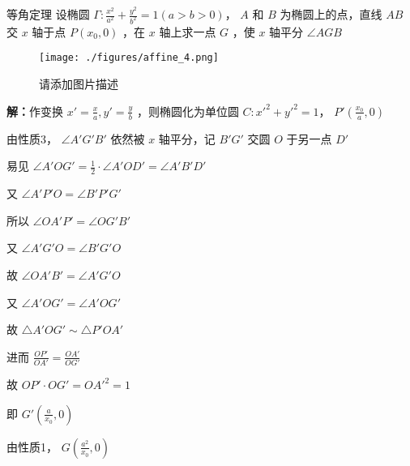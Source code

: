 \begin{corollary}{等角定理}
设椭圆 $\displaystyle{\Gamma:\frac{x^2}{a^2}+\frac{y^2}{b^2}=1(a>b>0)}$， $\displaystyle{A}$ 和 $\displaystyle{B}$ 为椭圆上的点，直线 $\displaystyle{AB}$ 交 $\displaystyle{x}$ 轴于点 $\displaystyle{P(x_0,0)}$ ，在 $\displaystyle{x}$ 轴上求一点 $\displaystyle{G}$ ，使 $\displaystyle{x}$ 轴平分 $\displaystyle{\angle AGB}$ 

\begin{figure}[ht]
\centering
\texttt{[image: ./figures/affine\_4.png]}
\caption{请添加图片描述} \label{affine_fig4}
\end{figure}
\textbf{解：}作变换 $\displaystyle{x'=\frac{x}{a},y'=\frac{y}{b}}$ ，则椭圆化为单位圆 $\displaystyle{C:x'^2+y'^2=1}$， $\displaystyle{P'\left(\frac{x_0}{a},0 \right)}$ 

由性质3， $\displaystyle{\angle A'G'B'}$ 依然被 $\displaystyle{x}$ 轴平分，记 $\displaystyle{B'G'}$ 交圆 $\displaystyle{O}$ 于另一点 $\displaystyle{D'}$

易见 $\displaystyle{\angle A'OG'=\frac{1}{2}\cdot\angle A'OD'=\angle A'B'D'}$ 

又 $\displaystyle{\angle A'P'O=\angle B'P'G'}$

所以 $\displaystyle{\angle OA'P'=\angle OG'B'}$

又 $\displaystyle{\angle A'G'O=\angle B'G'O}$

故 $\displaystyle{\angle OA'B'=\angle A'G'O}$

又 $\displaystyle{\angle A'OG'=\angle A'OG'}$

故 $\displaystyle{\triangle A'OG'\sim \triangle P'OA'}$

进而 $\displaystyle{\frac{OP'}{OA'}=\frac{OA'}{OG'}}$

故 $\displaystyle{OP'\cdot OG'=OA'^2=1}$ 

即 $\displaystyle{G'\left(\frac{a}{x_0},0\right)}$

由性质1， $\displaystyle{G\left( \frac{a^2}{x_0},0\right)}$ 

\end{corollary}

